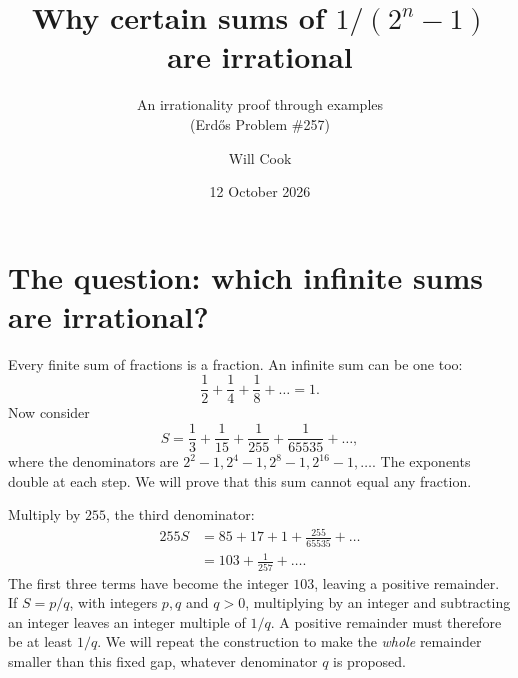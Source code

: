 \documentclass[10pt]{article}
\title{Why certain sums of $1/(2^n-1)$ are irrational}
\subtitle{An irrationality proof through examples\\ (Erd\H{o}s Problem \#257)}
\author{Will Cook}
\date{12 October 2026}
\theoremstyle{plain}
\theoremstyle{definition}
\theoremstyle{remark}
\begin{document}
\maketitle
{}

\section{The question: which infinite sums are irrational?}\label{sec:intro}

Every finite sum of fractions is a fraction. An infinite sum can be one too:
\[
 \frac12+\frac14+\frac18+\dots=1.
\]
Now consider
\[
 S=\frac13+\frac1{15}+\frac1{255}+\frac1{65535}+\dots,
\]
where the denominators are $2^2-1,2^4-1,2^8-1,2^{16}-1,\dots$.
The exponents double at each step. We will prove that this sum cannot equal
any fraction.

Multiply by $255$, the third denominator:
\[
\begin{aligned}
 255S&=85+17+1+\frac{255}{65535}+\dots\\
     &=103+\frac1{257}+\dots.
\end{aligned}
\]
The first three terms have become the integer $103$, leaving a positive
remainder. If $S=p/q$, with integers $p,q$ and $q>0$, multiplying by an
integer and subtracting an integer leaves an integer multiple of $1/q$.
A positive remainder must therefore be at least $1/q$. We will repeat the
construction to make the \emph{whole} remainder smaller than this fixed gap,
whatever denominator $q$ is proposed.
\end{document}
